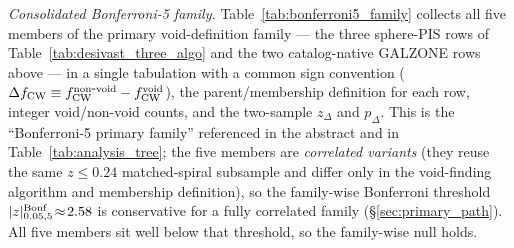 \documentclass[aps,prd,twocolumn,superscriptaddress,showpacs,preprintnumbers,nofootinbib,longbibliography,floatfix]{revtex4-2}
\begin{document}
\emph{Consolidated Bonferroni-5 family.}
Table~\ref{tab:bonferroni5_family} collects all five members of the
primary void-definition family --- the three sphere-PIS rows of
Table~\ref{tab:desivast_three_algo} and the two catalog-native GALZONE
rows above --- in a single tabulation with a common sign convention
($\Delta f_{\rm CW} \equiv f_{\rm CW}^{\rm non\mbox{-}void} -
f_{\rm CW}^{\rm void}$), the parent/membership definition for each row,
integer void/non-void counts, and the two-sample $z_\Delta$ and
$p_\Delta$. This is the ``Bonferroni-5 primary family'' referenced in the
abstract and in Table~\ref{tab:analysis_tree}; the five members are
\emph{correlated variants} (they reuse the same $z\!\le\!0.24$
matched-spiral subsample and differ only in the void-finding algorithm
and membership definition), so the family-wise Bonferroni threshold
$|z|^{\rm Bonf}_{0.05,5}\!\approx\!2.58$ is conservative for a fully
correlated family (\S\ref{sec:primary_path}). All five members sit well
below that threshold, so the family-wise null holds.
\end{document}
